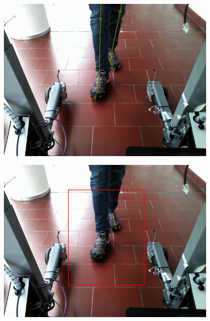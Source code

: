 \documentclass[a4paper]{report}
\begin{document}

\begin{figure}[H]
\centering
\begin{minipage}{.5\textwidth}
  \centering
    \includegraphics[width=0.98\textwidth]{images/building/results/frameGT40.png}
\end{minipage}%
\begin{minipage}{.5\textwidth}
  \centering
    \includegraphics[width=0.98\textwidth]{images/building/results/frame40.png}
    \label{img:Frame40}
\end{minipage}%
\end{figure}
\end{document}
